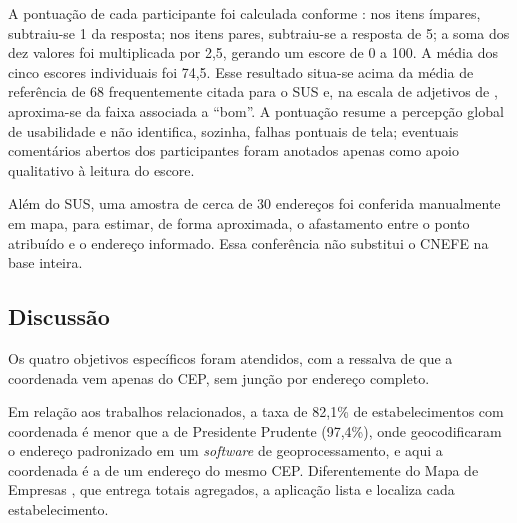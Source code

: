 A pontuação de cada participante foi calculada conforme : nos itens ímpares, subtraiu-se 1 da resposta; nos itens pares, subtraiu-se a resposta de 5; a soma dos dez valores foi multiplicada por 2,5, gerando um escore de 0 a 100.
A média dos cinco escores individuais foi 74,5.
Esse resultado situa-se acima da média de referência de 68 frequentemente citada para o SUS e, na escala de adjetivos de , aproxima-se da faixa associada a ``bom''.
A pontuação resume a percepção global de usabilidade e não identifica, sozinha, falhas pontuais de tela; eventuais comentários abertos dos participantes foram anotados apenas como apoio qualitativo à leitura do escore.

Além do SUS, uma amostra de cerca de 30 endereços foi conferida manualmente em mapa, para estimar, de forma aproximada, o afastamento entre o ponto atribuído e o endereço informado.
Essa conferência não substitui o CNEFE na base inteira.

\subsection{Discussão}

Os quatro objetivos específicos foram atendidos, com a ressalva de que a coordenada vem apenas do CEP, sem junção por endereço completo.

Em relação aos trabalhos relacionados, a taxa de 82,1\% de estabelecimentos com coordenada é menor que a de Presidente Prudente (97,4\%), onde  geocodificaram o endereço padronizado em um \textit{software} de geoprocessamento, e aqui a coordenada é a de um endereço do mesmo CEP.
Diferentemente do Mapa de Empresas \cite{brasil2026}, que entrega totais agregados, a aplicação lista e localiza cada estabelecimento.